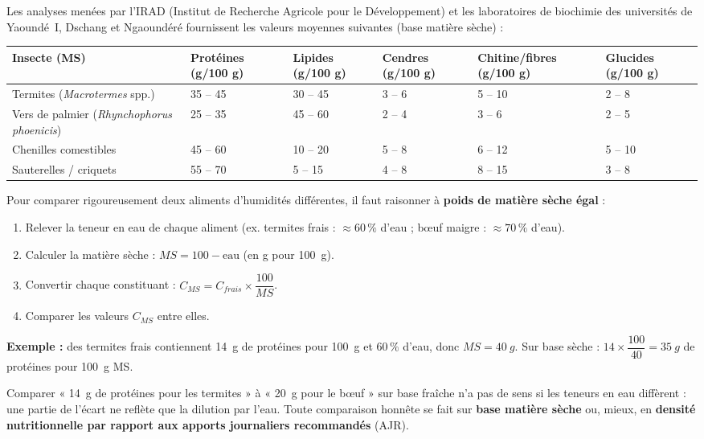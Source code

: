 \documentclass[11pt]{article}
\begin{document}
Les analyses menées par l'IRAD (Institut de Recherche Agricole pour le Développement) et les laboratoires de biochimie des universités de Yaoundé~I, Dschang et Ngaoundéré fournissent les valeurs moyennes suivantes (base matière sèche) :

\begin{center}
\begin{tabularx}{\linewidth}{|l|X|X|X|X|X|}
\hline
\rowcolor{popblueL} \textbf{Insecte (MS)} & \textbf{Protéines (g/100 g)} & \textbf{Lipides (g/100 g)} & \textbf{Cendres (g/100 g)} & \textbf{Chitine/fibres (g/100 g)} & \textbf{Glucides (g/100 g)} \\
\hline
Termites (\emph{Macrotermes} spp.) & 35 -- 45 & 30 -- 45 & 3 -- 6 & 5 -- 10 & 2 -- 8 \\
\hline
Vers de palmier (\emph{Rhynchophorus phoenicis}) & 25 -- 35 & 45 -- 60 & 2 -- 4 & 3 -- 6 & 2 -- 5 \\
\hline
Chenilles comestibles & 45 -- 60 & 10 -- 20 & 5 -- 8 & 6 -- 12 & 5 -- 10 \\
\hline
Sauterelles / criquets & 55 -- 70 & 5 -- 15 & 4 -- 8 & 8 -- 15 & 3 -- 8 \\
\hline
\end{tabularx}
\end{center}

\begin{methode}
Pour comparer rigoureusement deux aliments d'humidités différentes, il faut raisonner à \textbf{poids de matière sèche égal} :
\begin{enumerate}
\item Relever la teneur en eau de chaque aliment (ex. termites frais : $\approx 60\,\%$ d'eau ; bœuf maigre : $\approx 70\,\%$ d'eau).
\item Calculer la matière sèche : $MS = 100 - \text{eau}$ (en g pour \SI{100}{g}).
\item Convertir chaque constituant : $C_{MS} = C_{frais} \times \dfrac{100}{MS}$.
\item Comparer les valeurs $C_{MS}$ entre elles.
\end{enumerate}
\textbf{Exemple :} des termites frais contiennent \SI{14}{g} de protéines pour \SI{100}{g} et $60\,\%$ d'eau, donc $MS = \SI{40}{g}$. Sur base sèche : $14 \times \dfrac{100}{40} = \SI{35}{g}$ de protéines pour \SI{100}{g} MS.
\end{methode}

\begin{attention}
Comparer « \SI{14}{g} de protéines pour les termites » à « \SI{20}{g} pour le bœuf » sur base fraîche n'a pas de sens si les teneurs en eau diffèrent : une partie de l'écart ne reflète que la dilution par l'eau. Toute comparaison honnête se fait sur \textbf{base matière sèche} ou, mieux, en \textbf{densité nutritionnelle par rapport aux apports journaliers recommandés} (AJR).
\end{attention}
\end{document}
